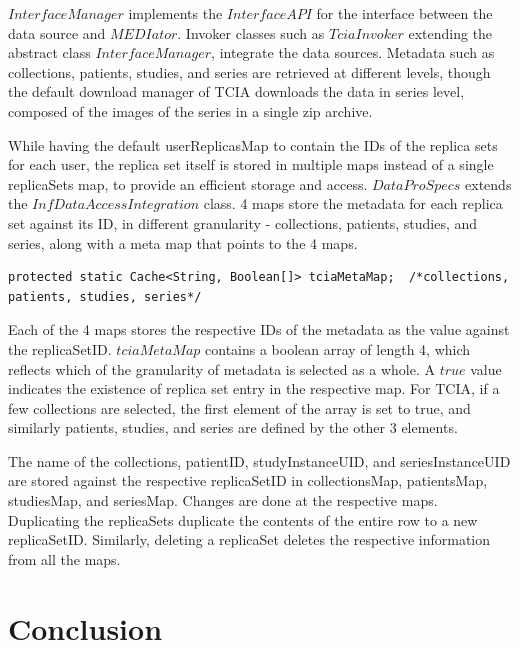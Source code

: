 \documentclass[letterpaper, 10 pt, conference]{ieeeconf}  %
\begin{document}
$InterfaceManager$ implements the $InterfaceAPI$ for the interface between the data source and $MEDIator$. Invoker classes such as $TciaInvoker$ extending the abstract class $InterfaceManager$, integrate the data sources. Metadata such as collections, patients, studies, and series are retrieved at different levels, though the default download manager of TCIA downloads the data in series level, composed of the images of the series in a single zip archive. 

While having the default userReplicasMap to contain the IDs of the replica sets for each user, the replica set itself is stored in multiple maps instead of a single replicaSets map, to provide an efficient storage and access. $DataProSpecs$ extends the $InfDataAccessIntegration$ class. 4 maps store the metadata for each replica set against its ID, in different granularity - collections, patients, studies, and series, along with a meta map that points to the 4 maps. 
\vspace{-20pt}
\begin{lstlisting}  
protected static Cache<String, Boolean[]> tciaMetaMap;  /*collections, patients, studies, series*/
\end{lstlisting} 
\vspace{-7pt}
Each of the 4 maps stores the respective IDs of the metadata as the value against the replicaSetID. $tciaMetaMap$ contains a boolean array of length 4, which reflects which of the granularity of metadata is selected as a whole. A $true$ value indicates the existence of replica set entry in the respective map. For TCIA, if a few collections are selected, the first element of the array is set to true, and similarly patients, studies, and series are defined by the other 3 elements.

The name of the collections, patientID, studyInstanceUID, and seriesInstanceUID are stored against the respective replicaSetID in collectionsMap, patientsMap, studiesMap, and seriesMap. Changes are done at the respective maps. Duplicating the replicaSets duplicate the contents of the entire row to a new replicaSetID. Similarly, deleting a replicaSet deletes the respective information from all the maps. 



\section{Conclusion}
\balance
\end{document}
